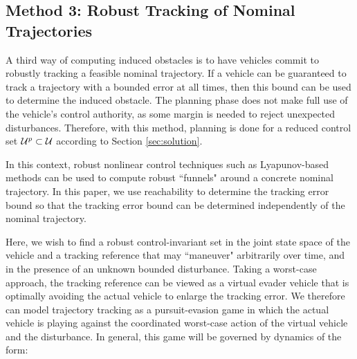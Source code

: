 \subsection{Method 3: Robust Tracking of Nominal Trajectories \label{sec:rtt}}
A third way of computing induced obstacles is to have vehicles commit to robustly tracking a feasible nominal trajectory. If a vehicle can be guaranteed to track a trajectory with a bounded error at all times, then this bound can be used to determine the induced obstacle.  The planning phase does not make full use of the vehicle's control authority, as some margin is needed to reject unexpected disturbances. Therefore, with this method, planning is done for a reduced control set $\mathcal{U}^p\subset\mathcal{U}$ according to Section \ref{sec:solution}.


In this context, robust nonlinear control techniques such as Lyapunov-based methods \cite{Majumdar2013} can be used to compute robust ``funnels" around a concrete nominal trajectory. In this paper, we use reachability to determine the tracking error bound so that the tracking error bound can be determined independently of the nominal trajectory. 

Here, we wish to find a robust control-invariant set in the joint state space of the vehicle and a tracking reference that may ``maneuver" arbitrarily over time, and in the presence of an unknown bounded disturbance. Taking a worst-case approach, the tracking reference can be viewed as a virtual evader vehicle that is optimally avoiding the actual vehicle to enlarge the tracking error. We therefore can model trajectory tracking as a pursuit-evasion game in which the actual vehicle is playing against the coordinated worst-case action of the virtual vehicle and the disturbance. In general, this game will be governed by dynamics of the form:


